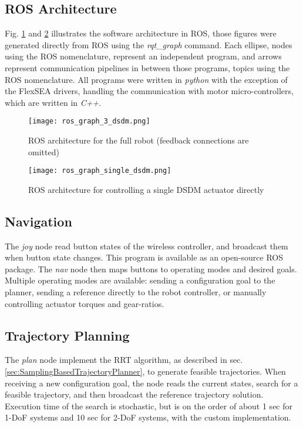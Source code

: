 \subsection{ROS Architecture}

Fig. \ref{fig:ros_3dsdm} and \ref{fig:ros_dsdm} illustrates the software architecture in ROS, those figures were generated directly from ROS using the \textit{rqt\_graph} command. Each ellipse, nodes using the ROS nomenclature, represent an independent program, and arrows represent communication pipelines in between those programs, topics using the ROS nomenclature. All programs were written in \textit{python} with the exception of the FlexSEA drivers, handling the communication with motor micro-controllers, which are written in \textit{C++}.

\begin{figure}[htpb]
	\centering
		\texttt{[image: ros\_graph\_3\_dsdm.png]}
	\caption{ROS architecture for the full robot (feedback connections are omitted)}
	\label{fig:ros_3dsdm}
\end{figure}

\begin{figure}[htpb]
	\centering
		\texttt{[image: ros\_graph\_single\_dsdm.png]}
	\caption{ROS architecture for controlling a single DSDM actuator directly}
	\label{fig:ros_dsdm}
\end{figure}


\subsection{Navigation}

The \textit{joy} node read button states of the wireless controller, and broadcast them when button state changes. This program is available as an open-source ROS package. The \textit{nav} node then maps buttons to operating modes and desired goals. Multiple operating modes are available: sending a configuration goal to the planner, sending a reference directly to the robot controller, or manually controlling actuator torques and gear-ratios. 

\subsection{Trajectory Planning}

The \textit{plan} node implement the RRT algorithm, as described in sec. \ref{sec:SamplingBasedTrajectoryPlanner}, to generate feasible trajectories. When receiving a new configuration goal, the node reads the current states, search for a feasible trajectory, and then broadcast the reference trajectory solution. Execution time of the search is stochastic, but is on the order of about 1 sec for 1-DoF systems and 10 sec for 2-DoF systems, with the custom implementation.

